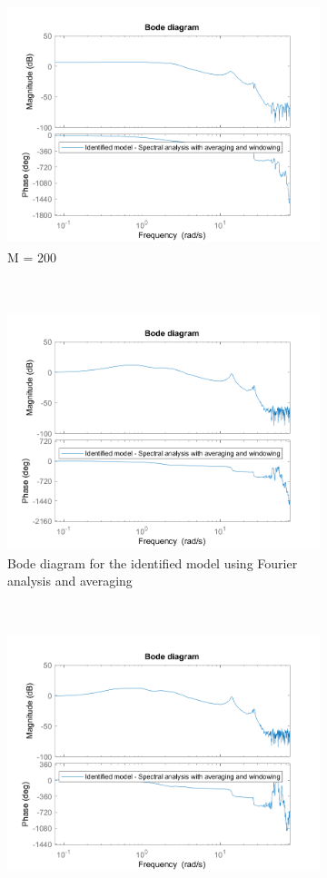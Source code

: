 \documentclass[a4paper,11pt]{article}
\begin{document}
\begin{figure}[H]
\centering
\begin{subfigure}[t]{0.45\textwidth}
  \centering
  \includegraphics[height = 7cm]{images/1_Spectral_analysis_m200}
  \caption{M = 200}
  \label{fig:bode_sa_m200}
\end{subfigure}
~\qquad \qquad
\begin{subfigure}[t]{0.45\textwidth}
  \centering
  \includegraphics[height = 7cm]{images/1_Spectral_analysis_m550}
  \caption{Bode diagram for the identified model using Fourier analysis and averaging}
  \label{fig:bode_sa_m550}
\end{subfigure}
~
\begin{subfigure}[t]{0.45\textwidth}
  \centering
  \includegraphics[height = 7cm]{images/1_Spectral_analysis_m650}

\end{subfigure}
\end{figure}
\end{document}
